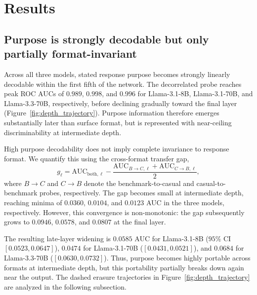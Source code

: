 \section{Results}


\subsection{Purpose is strongly decodable but only partially format-invariant}
\label{sec:results_phenomenon}

Across all three models, stated response purpose becomes strongly linearly decodable within the first fifth of the network. 
The decorrelated probe reaches peak ROC AUCs of 
\(0.989\), \(0.998\), and \(0.996\) 
for Llama-3.1-8B, Llama-3.1-70B, and Llama-3.3-70B, respectively, 
before declining gradually toward the final layer (Figure~\ref{fig:depth_trajectory}). 
Purpose information therefore emerges substantially later than surface format, 
but is represented with near-ceiling discriminability at intermediate depth.

High purpose decodability does not imply complete invariance to response format.
We quantify this using the cross-format transfer gap,
\[
g_\ell
=
\mathrm{AUC}_{\mathrm{both},\ell}
-
\frac{
    \mathrm{AUC}_{B\rightarrow C,\ell}
    +
    \mathrm{AUC}_{C\rightarrow B,\ell}
}{2},
\]
where \(B\rightarrow C\) and \(C\rightarrow B\) denote the benchmark-to-casual and casual-to-benchmark probes, respectively. The gap becomes small at
intermediate depth, reaching minima of \(0.0360\), \(0.0104\), and \(0.0123\)
AUC in the three models, respectively. However, this convergence is
non-monotonic: the gap subsequently grows to \(0.0946\), \(0.0578\), and
\(0.0807\) at the final layer.

The resulting late-layer widening is \(0.0585\) AUC for Llama-3.1-8B
(\(95\%\) CI \([0.0523, 0.0647]\)), \(0.0474\) for Llama-3.1-70B
(\([0.0431, 0.0521]\)), and \(0.0684\) for Llama-3.3-70B
(\([0.0630, 0.0732]\)). Thus, purpose becomes highly portable across formats
at intermediate depth, but this portability partially breaks down again near
the output. The dashed erasure trajectories in
Figure~\ref{fig:depth_trajectory} are analyzed in the following subsection.

